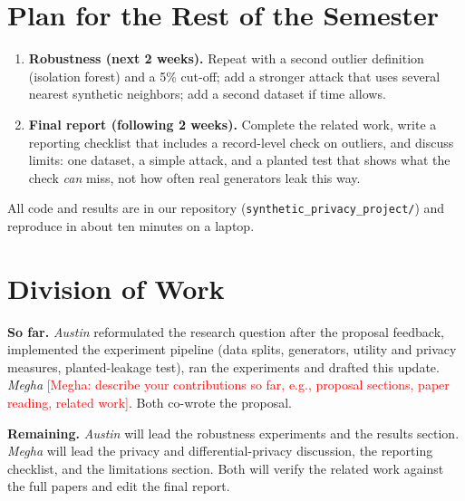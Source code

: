 \documentclass[11pt]{article}
\newcommand{\todo}[1]{\textcolor{red}{[#1]}}
\begin{document}
\section*{Plan for the Rest of the Semester}

\begin{enumerate}
\item \textbf{Robustness (next 2 weeks).} Repeat with a second outlier definition (isolation forest) and a 5\% cut-off; add a stronger attack that uses several nearest synthetic neighbors; add a second dataset if time allows.
\item \textbf{Final report (following 2 weeks).} Complete the related work, write a reporting checklist that includes a record-level check on outliers, and discuss limits: one dataset, a simple attack, and a planted test that shows what the check \emph{can} miss, not how often real generators leak this way.
\end{enumerate}
All code and results are in our repository (\texttt{synthetic\_privacy\_project/}) and reproduce in about ten minutes on a laptop.

\section*{Division of Work}

\textbf{So far.} \emph{Austin} reformulated the research question after the proposal feedback, implemented the experiment pipeline (data splits, generators, utility and privacy measures, planted-leakage test), ran the experiments and drafted this update. \emph{Megha} \todo{Megha: describe your contributions so far, e.g., proposal sections, paper reading, related work}. Both co-wrote the proposal.

\textbf{Remaining.} \emph{Austin} will lead the robustness experiments and the results section. \emph{Megha} will lead the privacy and differential-privacy discussion, the reporting checklist, and the limitations section. Both will verify the related work against the full papers and edit the final report.
\end{document}
